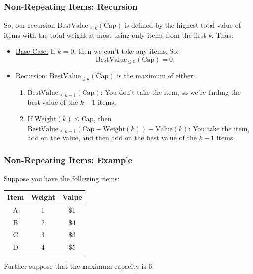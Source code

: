 \documentclass[letterpaper]{article}
\begin{document}
\subsubsection{Non-Repeating Items: Recursion}
So, our recursion $\text{BestValue}_{\leq k}(\text{Cap})$ is defined by the highest total value of items with the total weight at most  using only items from the first $k$. Thus:
\begin{itemize}
    \item \underline{Base Case:} If $k = 0$, then we can't take any items. So: 
    \[\text{BestValue}_{\leq 0}(\text{Cap}) = 0\]

    \item \underline{Recursion:} $\text{BestValue}_{\leq k}(\text{Cap})$ is the maximum of either: 
    \begin{enumerate}
        \item $\text{BestValue}_{\leq k - 1}(\text{Cap})$: You don't take the item, so we're finding the best value of the $k - 1$ items. 
        \item If $\text{Weight}(k) \leq \text{Cap}$, then $\text{BestValue}_{\leq k - 1}(\text{Cap} - \text{Weight}(k)) + \text{Value}(k)$: You take the item, add on the value, and then add on the best value of the $k - 1$ items. 
    \end{enumerate}
\end{itemize}

\subsubsection{Non-Repeating Items: Example}
Suppose you have the following items: 
\begin{center}
    \begin{tabular}{c|c|c}
        \textbf{Item} & \textbf{Weight} & \textbf{Value} \\ 
        \hline 
        A & 1 & \$1 \\ 
        B & 2 & \$4 \\ 
        C & 3 & \$3 \\ 
        D & 4 & \$5
    \end{tabular}
\end{center}
Further suppose that the maximum capacity is 6. 
\end{document}

